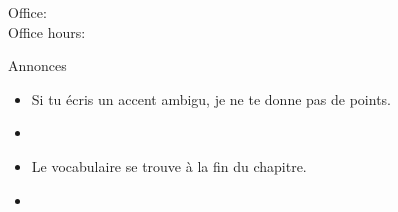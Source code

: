 \documentclass{beamer}
\subtitle[Dates]{Les dates importantes}
\begin{document}
  \begin{frame}
    \titlepage
    \tiny{Office: \\
          Office hours: }
  \end{frame}

  \begin{frame}{Annonces }
    \begin{itemize}
      \item Si tu écris un accent ambigu, je ne te donne pas de points.
      \item[] 
      \item Le vocabulaire se trouve à la fin du chapitre.
      \item[] 
    \end{itemize}
  \end{frame}

\end{document}
